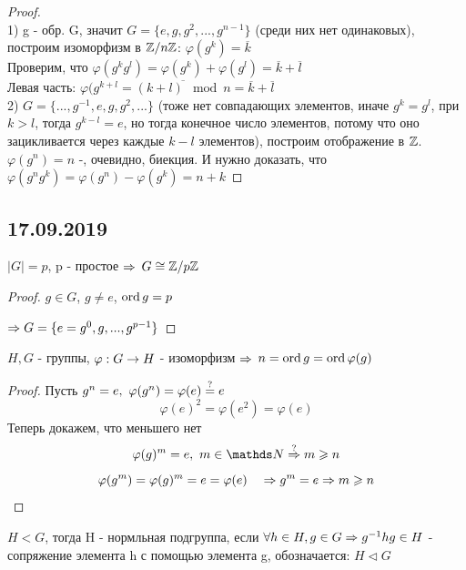 \documentclass[12pt, fleqn]{article}
\begin{document}
\begin{proof}\\
    1) g - обр. G, значит $G=\{e,g,g^2,...,g^{n-1}\}$ (среди них нет одинаковых), построим изоморфизм в $\mathbb{Z} / n \mathbb{Z}$: $\varphi(g^k)=\overline{k}$\\
    Проверим, что $\varphi(g^k g^l)= \varphi(g^k)+\varphi(g^l)=\overline{k}+\overline{l}$\\
    Левая часть: $\varphi(g^{k+l}=\overline{(k+l) \mod n} = \overline{k}+\overline{l}$\\
    2) $G=\{...,g^{-1},e,g,g^2,...\}$ (тоже нет совпадающих элементов, иначе $g^k=g^l$, при $k>l$, тогда $g^{k-l}=e$, но тогда конечное число элементов, потому что оно зацикливается через каждые $k-l$ элементов), построим отображение в $\mathbb{Z}$.\\
    $\varphi(g^n)=n$ -, очевидно, биекция. И нужно доказать, что $\varphi(g^n g^k)=\varphi(g^n)-\varphi(g^k)=n+k$
\end{proof}

\subsection{17.09.2019}
\begin{utv}
    $|G|=p$, p - простое $\Rightarrow$ $G \cong \mathbb{Z} /p \mathbb{Z}$
\end{utv}

\begin{proof}
    $g \in G$, $g \neq e$, $\mathop{\rm ord}\nolimits g=p$

    $\Rightarrow G=\{e=g^0,g,...,g^{p-1}\}$
\end{proof}

\begin{utv}
    $H,G$ - группы, $\varphi: G \rightarrow H$ - изоморфизм $\Rightarrow$ $n=\mathop{\rm ord}\nolimits g=\mathop{\rm ord}\nolimits \varphi(g)$
\end{utv}

\begin{proof}
    Пусть $g^n=e,\ \varphi(g^n)=\varphi(e)\os{?}{=}e$
    \[\varphi(e)^2=\varphi(e^2)=\varphi(e)\]
    Теперь докажем, что меньшего нет
    \[\varphi(g)^m = e,\ m \in \N \os{?}{\Ra} m \geqslant n\]
	\[\varphi(g^m) = \varphi(g)^m = e = \varphi(e) \quad \Rightarrow g^m = e \Rightarrow m \geqslant n\]
\end{proof}

\begin{definition}
    $H<G$, тогда H - нормльная подгруппа, если $\forall h \in H, g \in G \Rightarrow g^{-1}h g \in H$ - сопряжение элемента h с помощью элемента g, обозначается: $H \triangleleft G$
\end{definition}
\end{document}
